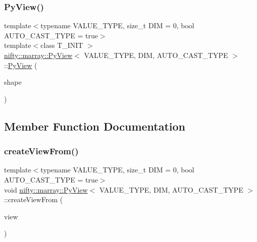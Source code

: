 \mbox{\label{classnifty_1_1marray_1_1PyView_a2a86aa379876d3ed5d81ed3b42bd094f}} 
\subsubsection{\texorpdfstring{Py\+View()}{PyView()}\hspace{0.1cm}{\footnotesize\ttfamily [4/4]}}
{\footnotesize\ttfamily template$<$typename V\+A\+L\+U\+E\+\_\+\+T\+Y\+PE, size\+\_\+t D\+IM = 0, bool A\+U\+T\+O\+\_\+\+C\+A\+S\+T\+\_\+\+T\+Y\+PE = true$>$ \\
template$<$class T\+\_\+\+I\+N\+IT $>$ \\
\hyperlink{classnifty_1_1marray_1_1PyView}{nifty\+::marray\+::\+Py\+View}$<$ V\+A\+L\+U\+E\+\_\+\+T\+Y\+PE, D\+IM, A\+U\+T\+O\+\_\+\+C\+A\+S\+T\+\_\+\+T\+Y\+PE $>$\+::\hyperlink{classnifty_1_1marray_1_1PyView}{Py\+View} (\begin{DoxyParamCaption}\item[{std\+::initializer\+\_\+list$<$ T\+\_\+\+I\+N\+IT $>$}]{shape }\end{DoxyParamCaption})\hspace{0.3cm}{\ttfamily [inline]}}



\subsection{Member Function Documentation}
\mbox{\label{classnifty_1_1marray_1_1PyView_abd0258ab2bf010a8b2fb07143161bf78}} 
\subsubsection{\texorpdfstring{create\+View\+From()}{createViewFrom()}}
{\footnotesize\ttfamily template$<$typename V\+A\+L\+U\+E\+\_\+\+T\+Y\+PE, size\+\_\+t D\+IM = 0, bool A\+U\+T\+O\+\_\+\+C\+A\+S\+T\+\_\+\+T\+Y\+PE = true$>$ \\
void \hyperlink{classnifty_1_1marray_1_1PyView}{nifty\+::marray\+::\+Py\+View}$<$ V\+A\+L\+U\+E\+\_\+\+T\+Y\+PE, D\+IM, A\+U\+T\+O\+\_\+\+C\+A\+S\+T\+\_\+\+T\+Y\+PE $>$\+::create\+View\+From (\begin{DoxyParamCaption}\item[{const \hyperlink{classandres_1_1View}{nifty\+::marray\+::\+View}$<$ V\+A\+L\+U\+E\+\_\+\+T\+Y\+PE $>$ \&}]{view }\end{DoxyParamCaption})\hspace{0.3cm}{\ttfamily [inline]}}

